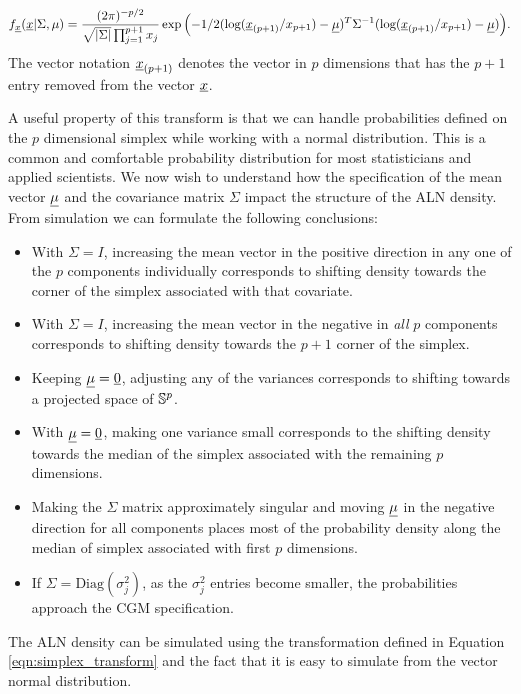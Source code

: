 \begin{equation}
f_{\underline{x}}(\underline{x}\vert \Sigma, \mu)=\frac{(2\pi)^{-p/2}}{\sqrt{\vert\Sigma\vert}\prod_{j=1}^{p+1}x_j } 
\exp{\left(-1/2(\text{log}(\underline{x}_{(p+1)}/x_{p+1})-\underline{\mu})^T\Sigma^{-1}(\text{log}(\underline{x}_{(p+1)}/x_{p+1})-\underline{\mu})\right)}.
\end{equation}
The vector notation $\underline{x}_{(p+1)}$ denotes the vector in $p$ dimensions that has the $p+1$ entry removed from the vector $\underline{x}$. 

A useful property of this transform is that we can handle probabilities defined on the $p$ dimensional simplex while working with a normal distribution. This is a common and comfortable probability distribution for most statisticians and applied scientists.
We now wish to understand how the specification of the mean vector $\underline{\mu}$ and the covariance matrix $\Sigma$ impact the structure of the ALN density. From simulation we can formulate the following conclusions: 

\begin{itemize}
\item With $\Sigma=I$, increasing the mean vector in the positive direction in any one of the $p$ components individually corresponds to shifting density towards the corner of the simplex associated with that covariate. 
\item With $\Sigma=I$, increasing the mean vector in the negative in \emph{all} $p$ components corresponds to shifting density towards the $p+1$ corner of the simplex. 
\item Keeping $\underline{\mu} =\underline{{0}}$, adjusting any of the variances corresponds to shifting towards a projected space of $\mathbb{S}^{p}$. 
\item With $\underline{\mu} =\underline{{0}}$, making one variance small corresponds to the shifting density towards the median of the simplex associated with the remaining $p$ dimensions. 
\item Making the $\Sigma$ matrix approximately singular and moving $\underline{\mu}$ in the negative direction for all components places most of the probability density along the median of simplex associated with first $p$ dimensions. 
\item If $\Sigma = \text{Diag}(\sigma^2_j)$, as the $\sigma^2_j$ entries become smaller, the probabilities approach the CGM specification.    
\end{itemize}

The ALN density can be simulated using the transformation defined in Equation \ref{eqn:simplex_transform} and the fact that it is easy to simulate from the vector normal distribution. 

